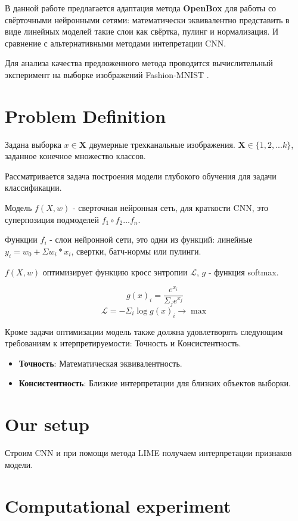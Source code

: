 \documentclass[12pt]{article}
\begin{document}
В данной работе предлагается адаптация метода \textbf{OpenBox} для работы со свёрточными нейронными сетями: математически эквивалентно представить в виде линейных моделей такие слои как свёртка, пулинг и нормализация. И сравнение с альтернативными методами интепретации CNN.

Для анализа качества предложенного метода проводится вычислительный эксперимент на выборке изображений Fashion-MNIST \citep{fashionmnist}.



\section{Problem Definition}
\label{sec:headings}

Задана выборка $x \in \mathbf{X}$ двумерные трехканальные изображения. $\mathbf{X} \in \{1, 2, ... k\}$, заданное конечное множество классов.

Рассматривается задача построения модели глубокого обучения для задачи классификации.

Модель $f(X, w)$ - сверточная нейронная сеть, для краткости CNN, это суперпозиция подмоделей $f_1 \circ f_2 \dots f_n$.

Функции $f_i$ - слои нейронной сети, это одни из функций: линейные $y_i = w_0 + \Sigma w_i * x_i$, свертки, батч-нормы или пулинги.

$f(X, w)$ оптимизирует функцию кросс энтропии $\mathcal{L}$, $g$ - функция softmax.

$$g(x)_i = \frac{e^{x_i}}{\Sigma_j e^{x_j}}$$
$$\mathcal{L} = -\Sigma_i \log g(x)_i \to \max$$

Кроме задачи оптимизации модель также должна удовлетворять следующим требованиям к итерпретируемости: $\textbf{Точность}$ и $\textbf{Консистентность}$.
\begin{itemize}
    \item \textbf{Точность}:
    Математическая эквивалентность.
    \item \textbf{Консистентность}:
    Близкие интерпретации для близких объектов выборки.
\end{itemize}

\section{Our setup}

Строим CNN и при помощи метода LIME \cite{ribeiro2016why} получаем интерпретации признаков модели.

\section{Computational experiment}
\end{document}
